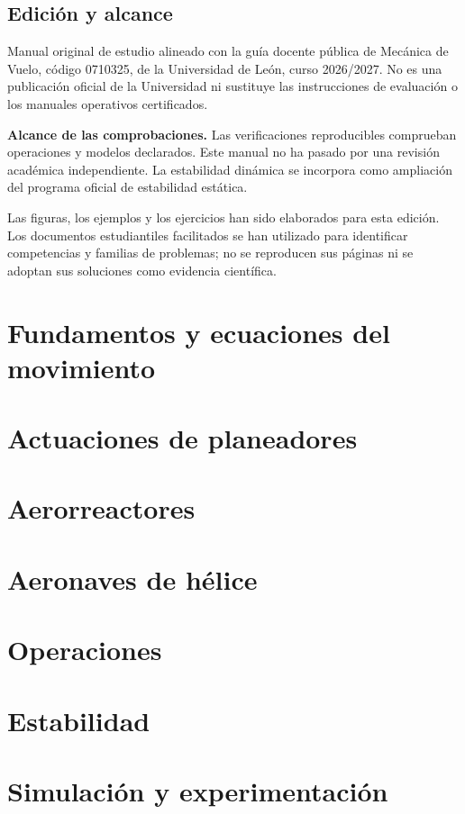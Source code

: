 
\renewcommand{\studiumcoverphoto}{assets/cover-manual.jpg}

\frontmatter
\chapter*{Edición y alcance}
Manual original de estudio alineado con la guía docente pública de Mecánica de Vuelo, código 0710325, de la Universidad de León, curso 2026/2027. No es una publicación oficial de la Universidad ni sustituye las instrucciones de evaluación o los manuales operativos certificados.

\textbf{Alcance de las comprobaciones.} Las verificaciones reproducibles comprueban operaciones y modelos declarados. Este manual no ha pasado por una revisión académica independiente. La estabilidad dinámica se incorpora como ampliación del programa oficial de estabilidad estática.


 Las figuras, los ejemplos y los ejercicios han sido elaborados para esta edición. Los documentos estudiantiles facilitados se han utilizado para identificar competencias y familias de problemas; no se reproducen sus páginas ni se adoptan sus soluciones como evidencia científica.
\tableofcontents
\mainmatter
\part{Fundamentos y ecuaciones del movimiento}






\part{Actuaciones de planeadores}



\part{Aerorreactores}





\part{Aeronaves de hélice}


\part{Operaciones}


\part{Estabilidad}



\part{Simulación y experimentación}




